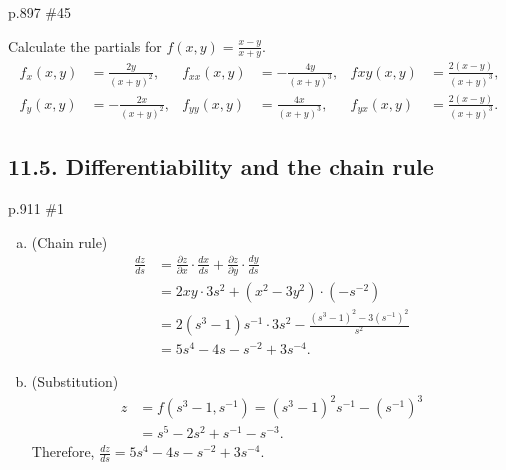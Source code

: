 \begin{practice}p.897 \#45\end{practice}
\begin{pracsol}
  Calculate the partials for $f(x,y)=\frac{x-y}{x+y}$.
  \begin{align*}
    f_x(x,y) &= \frac{2y}{(x+y)^2},&f_{xx}(x,y) &=-\frac{4y}{(x+y)^3}, &f{xy}(x,y) &= \frac{2(x-y)}{(x+y)^3},\\
    f_y(x,y) &= -\frac{2x}{(x+y)^2}, &f_{yy}(x,y) &= \frac{4x}{(x+y)^3}, &f_{yx}(x,y) &= \frac{2(x-y)}{(x+y)^3}.
  \end{align*}
\end{pracsol}

\subsection*{11.5. Differentiability and the chain rule}
\begin{practice}p.911 \#1\end{practice}
\begin{pracsol}
  \begin{enumerate}[(a)]
    \item (Chain rule)
    \[\begin{split}
      \frac{dz}{ds} &= \frac{\partial z}{\partial x}\cdot\frac{dx}{ds}+\frac{\partial z}{\partial y}\cdot\frac{dy}{ds}\\
      &= 2xy\cdot 3s^2 + (x^2-3y^2)\cdot(-s^{-2})\\
      &= 2(s^3-1)s^{-1}\cdot 3s^2-\frac{(s^3-1)^2-3(s^{-1})^2}{s^2}\\
      &= 5s^4-4s-s^{-2}+3s^{-4}.
    \end{split}\]

    \item (Substitution)
    \[\begin{split}
      z &=f(s^3-1,s^{-1})=(s^3-1)^2s^{-1}-(s^{-1})^3\\
      &= s^5-2s^2+s^{-1}-s^{-3}.
    \end{split}\]
      Therefore, $\frac{dz}{ds}=5s^4-4s-s^{-2}+3s^{-4}$.
  \end{enumerate}
\end{pracsol}

